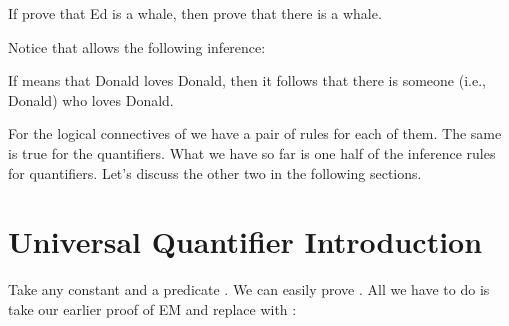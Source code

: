 \begin{argumentN}[1]

 \aitem {}
 \aitem {}
 \aitem {}
 \aitem {}
 \aitem {}

\end{argumentN}

If \p{\Gamma,\Delta} prove that Ed is a whale, then \p{\Gamma,\Delta} prove that 
there is a whale. 

Notice that \exI{} allows the following inference:

\begin{argument*}


\end{argument*}

If  means that Donald loves Donald, then it follows that there is someone 
(i.e., Donald) who loves Donald.


For the logical connectives of \lL{} we have a pair of rules for each of them.  
The same is true for the quantifiers.  What we have so far is one half of the 
inference rules for quantifiers. Let's discuss the other two in the following 
sections.






\section{Universal Quantifier Introduction}


Take any constant  and a predicate . We can easily prove . All we have to do is take our earlier proof of EM and replace 
 with :


\begin{argument*}










\end{argument*}

